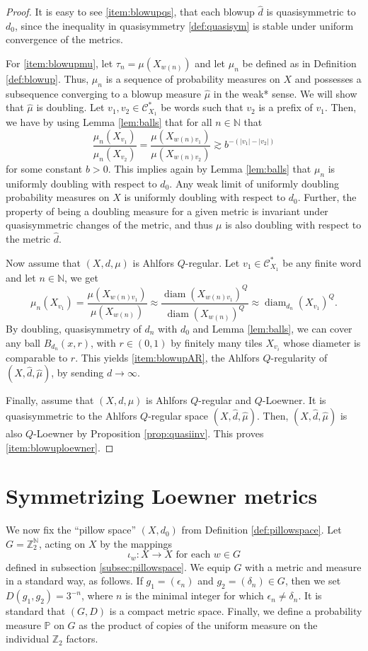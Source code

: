 \documentclass{amsart}
\DeclareMathOperator{\diam}{diam}
\theoremstyle{plain}
\theoremstyle{definition}
\numberwithin{equation}{section}
\numberwithin{theorem}{section}
\newcommand{\N}{\mathbb{N}}
\newcommand{\cC}{\mathcal{C}}
\begin{document}
\begin{proof}
It is easy to see \eqref{item:blowupqs}, that each blowup  $\hat{d}$ is quasisymmetric to $d_0$, since the inequality in quasisymmetry \ref{def:quasisym} is stable under uniform convergence of the metrics. 

For \eqref{item:blowupmu}, let $\tau_n=\mu(X_{w(n)})$ and let $\mu_n$ be defined as in Definition \ref{def:blowup}. Thus, $\mu_n$ is a sequence of probability measures on $X$ and possesses a subsequence converging to a blowup measure $\hat{\mu}$ in the weak* sense. We will show that $\hat{\mu}$ is doubling. Let $v_1,v_2\in \cC_{X_1}^*$  be words such that $v_2$ is a prefix of $v_1$. Then, we have by using Lemma \ref{lem:balls} that for all $n\in \N$ that
\[
\frac{\mu_n(X_{v_1})}{\mu_n(X_{v_2})}=\frac{\mu(X_{w(n)v_1})}{\mu(X_{w(n)v_2})}\gtrsim b^{-(|v_1|-|v_2|)}
\]
for some constant $b>0$.  This implies again by Lemma \ref{lem:balls} that $\mu_n$ is uniformly doubling with respect to $d_0$. Any weak limit of uniformly doubling probability measures on $X$ is uniformly doubling with respect to $d_0$. Further, the property of being a doubling measure for a given metric is invariant under quasisymmetric changes of the metric, and thus $\mu$ is also doubling with respect to the metric $\hat{d}$. 

Now assume that $(X,d,\mu)$ is Ahlfors $Q$-regular. Let $v_1\in \cC_{X_1}^*$  be any finite word and let $n\in \N$, we get
\[
\mu_n(X_{v_1})=\frac{\mu(X_{w(n)v_1})}{\mu(X_{w(n)})}\approx \frac{\diam(X_{w(n)v_1})^Q}{\diam(X_{w(n)})^Q} \approx \diam_{d_n}(X_{v_1})^Q.
\]
By doubling, quasisymmetry of $d_n$ with $d_0$ and Lemma \ref{lem:balls}, we can cover any ball $B_{d_n}(x,r)$, with $r\in (0,1)$ by finitely many tiles $X_{v_i}$ whose diameter is comparable to $r$. This yields \eqref{item:blowupAR}, the Ahlfors $Q$-regularity of $(X,\hat{d},\hat{\mu})$, by sending $d\to \infty$.

Finally, assume that $(X,d,\mu)$ is Ahlfors $Q$-regular and $Q$-Loewner. It is quasisymmetric to the Ahlfors $Q$-regular space $(X,\hat{d},\hat{\mu})$. Then, $(X,\hat{d},\hat{\mu})$ is also $Q$-Loewner by Proposition \ref{prop:quasiinv}. This proves \eqref{item:blowuploewner}.

\end{proof}


\section{Symmetrizing Loewner metrics}
We now fix the ``pillow space'' $(X,d_0)$ from Definition \ref{def:pillowspace}. Let $G=\mathbb{Z}_2^\mathbb{N}$, acting on $X$ by the mappings
$$ \iota_w\colon X\rightarrow X \text{ for each }w\in G$$
defined in subsection \ref{subsec:pillowspace}. We equip $G$ with a metric and measure in a standard way, as follows. If $g_1 = (\epsilon_n)$ and $g_2=(\delta_n) \in G$, then we set $D(g_1, g_2)= 3^{-n}$, where $n$ is the minimal integer for which $\epsilon_n\neq \delta_n$. It is standard that $(G,D)$ is a compact metric space. Finally, we define a probability measure $\mathbb{P}$ on $G$ as the product of copies of the uniform measure on the individual $\mathbb{Z}_2$ factors.
\end{document}
